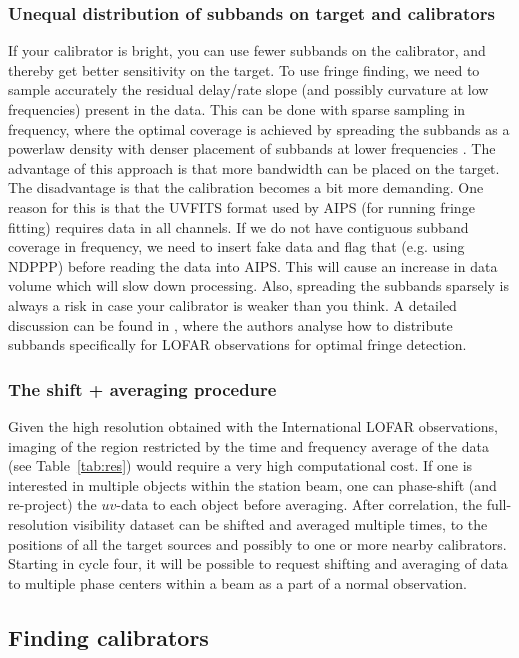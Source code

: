 \documentclass[graybox]{svmult}
\begin{document}
\subsubsection{Unequal distribution of subbands on target and
calibrators}\label{sec:bwdist} 
If your calibrator is bright, you can use fewer subbands on the calibrator, and
thereby get better sensitivity on the target. To use fringe finding, we need to
sample accurately the residual delay/rate slope (and possibly curvature at low
frequencies) present in the data. This can be done with sparse sampling in
frequency, where the optimal coverage is achieved by spreading the subbands as
a powerlaw density with denser placement of subbands at lower frequencies
\citep{marti-vidal10}. The advantage of this approach is that more bandwidth
can be placed on the target.  The disadvantage is that the calibration becomes
a bit more demanding. One reason for this is that the UVFITS format used by
AIPS (for running fringe fitting) requires data in all channels.  If we do not
have contiguous subband coverage in frequency, we need to insert fake data and
flag that (e.g. using NDPPP) before reading the data into AIPS.  This will
cause an increase in data volume which will slow down processing.  Also,
spreading the subbands sparsely is always a risk in case your calibrator is
weaker than you think. A detailed discussion can be found in
\cite{marti-vidal10}, where the authors analyse how to distribute subbands
specifically for LOFAR observations for optimal fringe detection.

\subsubsection{The shift + averaging procedure}\label{sect:shift}
Given the high resolution obtained with the
International LOFAR observations, imaging of the region restricted by the time
and frequency average of the data (see Table~\ref{tab:res}) would require a
very high computational cost. If one is interested in multiple objects within
the station beam, one can phase-shift (and re-project) the $uv$-data to each
object before averaging.  After correlation, the full-resolution visibility
dataset can be shifted and averaged multiple times, to the positions of all the
target sources and possibly to one or more nearby calibrators. Starting in
cycle four, it will be possible to request shifting and averaging of data to
multiple phase centers within a beam as a part of a normal observation.

\subsection{Finding calibrators}\label{findcalib}
\end{document}
